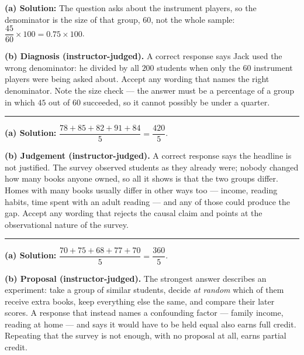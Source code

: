 \documentclass[12pt]{article}
\begin{document}
\textbf{(a) Solution:} \quad The question asks about the instrument players, so the denominator is
the size of that group, $60$, not the whole sample:
$\dfrac{45}{60} \times 100 = 0.75 \times 100$. 

\textbf{(b) Diagnosis (instructor-judged).} A correct response says Jack used the wrong
denominator: he divided by all $200$ students when only the $60$ instrument players were being
asked about. Accept any wording that names the right denominator. Note the size check --- the
answer must be a percentage of a group in which $45$ out of $60$ succeeded, so it cannot possibly
be under a quarter.

\vspace{0.2cm}

\noindent\rule{\linewidth}{0.2pt}


\textbf{(a) Solution:} \quad $\dfrac{78 + 85 + 82 + 91 + 84}{5} = \dfrac{420}{5}$. 

\textbf{(b) Judgement (instructor-judged).} A correct response says the headline is not
justified. The survey observed students as they already were; nobody changed how many books
anyone owned, so all it shows is that the two groups differ. Homes with many books usually differ
in other ways too --- income, reading habits, time spent with an adult reading --- and any of those
could produce the gap. Accept any wording that rejects the causal claim and points at the
observational nature of the survey.

\vspace{0.2cm}

\noindent\rule{\linewidth}{0.2pt}


\textbf{(a) Solution:} \quad $\dfrac{70 + 75 + 68 + 77 + 70}{5} = \dfrac{360}{5}$. 

\textbf{(b) Proposal (instructor-judged).} The strongest answer describes an experiment: take a
group of similar students, decide \textit{at random} which of them receive extra books, keep
everything else the same, and compare their later scores. A response that instead names a
confounding factor --- family income, reading at home --- and says it would have to be held equal
also earns full credit. Repeating that the survey is not enough, with no proposal at all, earns
partial credit.
\end{document}
